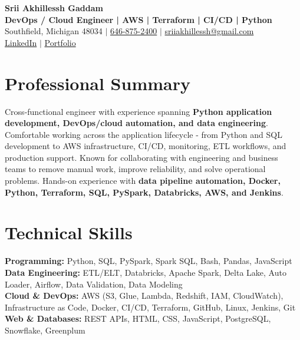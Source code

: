 \documentclass[letterpaper,10pt]{article}
\begin{document}
\fontsize{9.35pt}{10.45pt}\selectfont

\begin{center}
    {\LARGE \textbf{Srii Akhillessh Gaddam}} \\[-1pt]
    \textbf{DevOps / Cloud Engineer | AWS | Terraform | CI/CD | Python} \\[2pt]
    Southfield, Michigan 48034 $|$
    \href{tel:6468752400}{646-875-2400} $|$
    \href{mailto:sriiakhillessh@gmail.com}{sriiakhillessh@gmail.com} \\[1pt]
    \href{https://www.linkedin.com/in/srii-akhiilessh-gaddam-b48668191/}{LinkedIn} $|$
    \href{https://sriiakhillesshg.github.io/portfolio/}{Portfolio}
\end{center}
\vspace{-8pt}

\section{Professional Summary}
\small{Cross-functional engineer with experience spanning \textbf{Python application development, DevOps/cloud automation, and data engineering}. Comfortable working across the application lifecycle - from Python and SQL development to AWS infrastructure, CI/CD, monitoring, ETL workflows, and production support. Known for collaborating with engineering and business teams to remove manual work, improve reliability, and solve operational problems. Hands-on experience with \textbf{data pipeline automation, Docker, Python, Terraform, SQL, PySpark, Databricks, AWS, and Jenkins}.}

\section{Technical Skills}
\small{
\textbf{Programming:} Python, SQL, PySpark, Spark SQL, Bash, Pandas, JavaScript \\
\textbf{Data Engineering:} ETL/ELT, Databricks, Apache Spark, Delta Lake, Auto Loader, Airflow, Data Validation, Data Modeling \\
\textbf{Cloud \& DevOps:} AWS (S3, Glue, Lambda, Redshift, IAM, CloudWatch), Infrastructure as Code, Docker, CI/CD, Terraform, GitHub, Linux, Jenkins, Git \\
\textbf{Web \& Databases:} REST APIs, HTML, CSS, JavaScript, PostgreSQL, Snowflake, Greenplum
}
\end{document}
